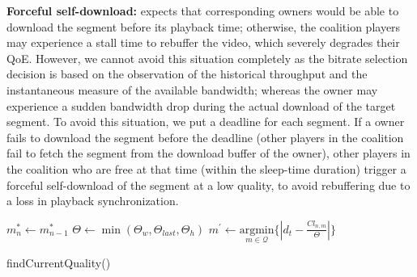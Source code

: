 \textbf{Forceful self-download:} {\our} expects that corresponding owners would be able to download the segment before its playback time; otherwise, the coalition players may experience a stall time to rebuffer the video, which severely degrades their QoE. However, we cannot avoid this situation completely as the bitrate selection decision is based on the observation of the historical throughput and the instantaneous measure of the available bandwidth; whereas the owner may experience a sudden bandwidth drop during the actual download of the target segment. To avoid this situation, we put a deadline for each segment. If a owner fails to download the segment before the deadline (other players in the coalition fail to fetch the segment from the download buffer of the owner), other players in the coalition who are free at that time (within the sleep-time duration) trigger a forceful self-download of the segment at a low quality, to avoid rebuffering due to a loss in playback synchronization.
\begin{algorithm}[!ht]
    \scriptsize
	\DontPrintSemicolon
	$m^*_{n} \leftarrow m^*_{n-1}$ \; \label{algo:chap06:quality:line:mstar}
	$\varTheta \leftarrow \min(\varTheta_w, \varTheta_{last}, \varTheta_h)$ \; \label{algo:chap06:quality:line:theta}
	$m^\prime \leftarrow \underset{m \in \mathcal{Q}}{\mathrm{argmin}} \{\left| d_t - \frac{Cl_{n,m}}{\varTheta}\right| \} $\; \label{algo:chap06:quality:line:mprime}
	\caption{\label{algo:chap06:quality}findCurrentQuality()}
\end{algorithm}
